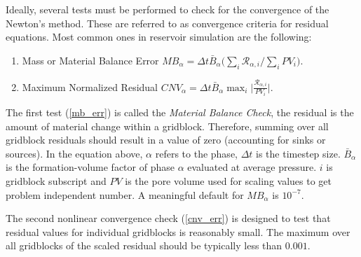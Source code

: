 Ideally, several tests must be performed to check for the convergence of the Newton's method. These are referred to as convergence criteria for residual equations. 
Most common ones in reservoir simulation are the following:

\begin{enumerate}[label=\color{alizarin}\Roman*.]
	\item\label{mb_err} Mass or Material Balance Error $MB_{\alpha} = \Delta t \bar{B}_{\alpha} \Big(\sum_{i}\mathcal{R}_{\alpha,i}/\sum_{i}PV_{i}\Big)$.
	\item\label{cnv_err} Maximum Normalized Residual $CNV_{\alpha} = \Delta t \bar{B}_{\alpha} \max_{i}\Big|\frac{\mathcal{R}_{\alpha,i}}{PV_{i}}\Big|$.
\end{enumerate}
The first test (\ref{mb_err}) is called the \textit{Material Balance Check}, the residual is the amount of material change within a gridblock. Therefore, summing over
all gridblock residuals should result in a value of zero (accounting for sinks or sources). In the equation above, $\alpha$ refers to the phase, $\Delta t$ is the timestep size. 
$\bar{B}_{\alpha}$ is the formation-volume factor of phase $\alpha$ evaluated at average pressure. $i$ is gridblock subscript and $PV$ is the pore volume used for scaling values to 
get problem independent number. A meaningful default for $MB_{\alpha}$ is $10^{-7}$.

The second nonlinear convergence check (\ref{cnv_err}) is designed to test that residual values for individual gridblocks is reasonably small. The maximum over all gridblocks of 
the scaled residual should be typically less than $0.001$.
\clearpage

